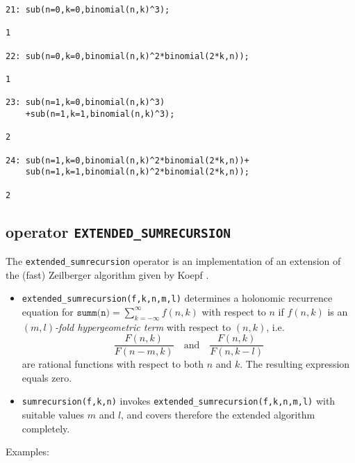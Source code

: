 {\small
\begin{verbatim}
21: sub(n=0,k=0,binomial(n,k)^3);

1

22: sub(n=0,k=0,binomial(n,k)^2*binomial(2*k,n));

1

23: sub(n=1,k=0,binomial(n,k)^3)
    +sub(n=1,k=1,binomial(n,k)^3);

2

24: sub(n=1,k=0,binomial(n,k)^2*binomial(2*k,n))+
    sub(n=1,k=1,binomial(n,k)^2*binomial(2*k,n));

2
\end{verbatim}
}\noindent

\subsection{\REDUCE{} operator \texttt{EXTENDED\_SUMRECURSION}}
\label{sec:EXTENDED_SUMRECURSION}
\hypertarget{operator:EXTENDED_SUMRECURSION}{}

The \texttt{extended\_sumrecursion} operator is an implementation
of an extension of the (fast) Zeilberger algorithm given by Koepf
\cite{Koepf:94b}.
\begin{itemize}
\item
\texttt{extended\_sumrecursion(f,k,n,m,l)} determines a holonomic recurrence
equation for $\texttt{summ(n)} =\sum\limits_{k=-\infty}^\infty f(n,k)$
with respect to $n$ if $f(n,k)$ is an \textsl{$(m,l)$-fold hypergeometric term}
with respect to $(n,k)$, i.e.
\[
\frac{F(n,k)}{F(n-m,k)}
\quad
\mbox{and}
\quad
\frac{F(n,k)}{F(n,k-l)}
\]
are rational functions with respect to both $n$ and $k$.
The resulting expression equals zero.
\item
\texttt{sumrecursion(f,k,n)} invokes \texttt{extended\_sumrecursion(f,k,n,m,l)}
with suitable values $m$ and $l$, and covers therefore the extended
algorithm completely.
\end{itemize}
Examples:

